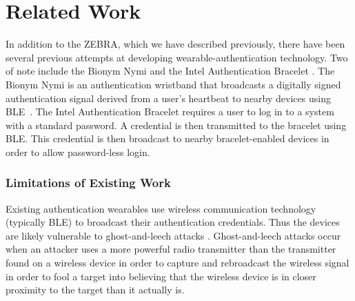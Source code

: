 \documentclass[runningheads,a4paper]{llncs}
\begin{document}
\section{Related Work}\label{sec:related}

In addition to the ZEBRA, which we have described previously, there have been several previous attempts at developing wearable-authentication technology.  Two of note include the Bionym Nymi \cite{goode2014bring} and the Intel Authentication Bracelet \cite{idf2015intel}.  The Bionym Nymi is an authentication wristband that broadcasts a digitally signed authentication signal derived from a user's heartbeat to nearby devices using BLE~\cite{BLEoverview}.  The Intel Authentication Bracelet requires a user to log in to a system with a standard password.  A credential is then transmitted to the bracelet using BLE.  This credential is then broadcast to nearby bracelet-enabled devices in order to allow password-less login.

\subsubsection{Limitations of Existing Work}
Existing authentication wearables use wireless communication technology (typically BLE) to broadcast their authentication credentials.  Thus the devices are likely vulnerable to ghost-and-leech attacks \cite{czeskis2008rfids}.  Ghost-and-leech attacks occur when an attacker uses a more powerful radio transmitter than the transmitter found on a wireless device in order to capture and rebroadcast the wireless signal in order to fool a target into believing that the wireless device is in closer proximity to the target than it actually is.

\end{document}
